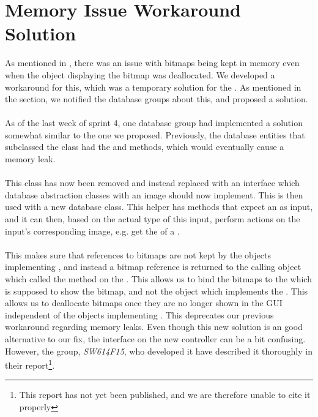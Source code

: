 
\section{Memory Issue Workaround Solution}
\label{sec:memory_issue_workaround_solution}

As mentioned in , there was an issue with bitmaps being kept in memory even when the object displaying the bitmap was deallocated. We developed a workaround for this, which was a temporary solution for the . As mentioned in the section, we notified the database groups about this, and proposed a solution.
\\\\
As of the last week of sprint 4, one database group had implemented a solution somewhat similar to the one we proposed. Previously, the database entities that subclassed the  class had the  and  methods, which would eventually cause a memory leak.
\\\\
This class has now been removed and instead replaced with an  interface which database abstraction classes with an image should now implement. This  is then used with a new  database class. This helper has methods that expect an  as input, and it can then, based on the actual type of this input, perform actions on the input's corresponding image, e.g. get the  of a .
\\\\
This makes sure that references to bitmaps are not kept by the objects implementing , and instead a bitmap reference is returned to the calling object which called the  method on the . This allows us to bind the bitmaps to the  which is supposed to show the bitmap, and not the object which implements the . This allows us to deallocate bitmaps once they are no longer shown in the GUI independent of the objects implementing . This deprecates our previous workaround regarding memory leaks. Even though this new solution is an good alternative to our fix, the interface on the new controller can be a bit confusing. However, the group, \emph{SW614F15}, who developed it have described it thoroughly in their report\footnote{This report has not yet been published, and we are therefore unable to cite it properly}.